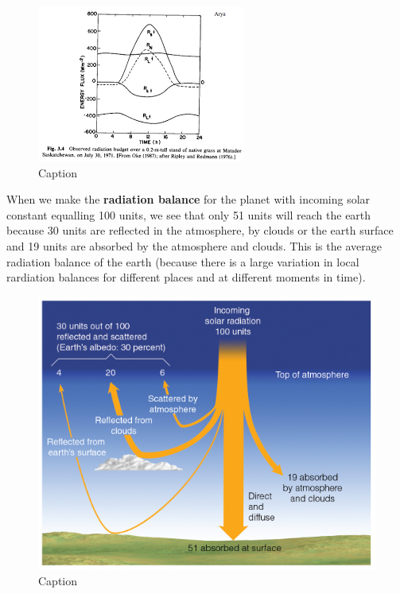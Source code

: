 \documentclass[12pt,oneside]{book}
\begin{document}
\begin{figure}

{\centering \includegraphics[width=0.9\linewidth]{figures/Figure137} 

}

\caption{Caption}\label{fig:RadiationCycle2}
\end{figure}

When we make the \textbf{radiation balance} for the planet with incoming
solar constant equalling 100 units, we see that only 51 units will reach
the earth because 30 units are reflected in the atmosphere, by clouds or
the earth surface and 19 units are absorbed by the atmosphere and
clouds. This is the average radiation balance of the earth (because
there is a large variation in local rardiation balances for different
places and at different moments in time).

\begin{figure}

{\centering \includegraphics[width=0.65\linewidth]{figures/Figure138} 

}

\caption{Caption}\label{fig:RadiationBal}
\end{figure}
\end{document}
